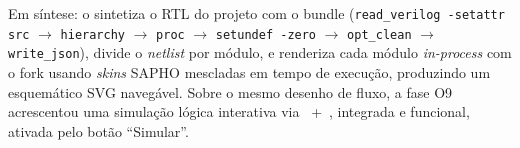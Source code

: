 \begin{nota}
Em síntese: o  sintetiza o RTL do projeto com o  bundle
(\lstinline|read_verilog -setattr src| $\rightarrow$ \lstinline|hierarchy| $\rightarrow$
\lstinline|proc| $\rightarrow$ \lstinline|setundef -zero| $\rightarrow$
\lstinline|opt_clean| $\rightarrow$ \lstinline|write_json|), divide o
\emph{netlist} por módulo, e renderiza cada módulo \emph{in-process} com o fork
 usando \emph{skins} SAPHO mescladas em tempo de
execução, produzindo um esquemático SVG navegável. Sobre o mesmo desenho de
fluxo, a fase O9 acrescentou uma simulação lógica interativa via
~+~, integrada e funcional, ativada pelo
botão \enquote{Simular}.
\end{nota}
